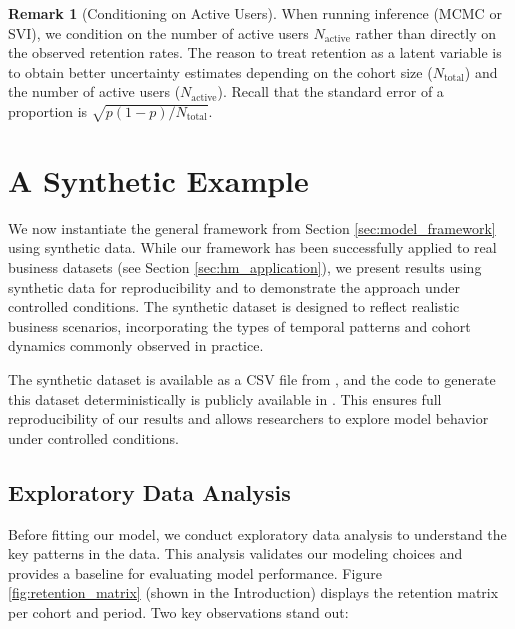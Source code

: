 \documentclass[11pt]{amsart}
\theoremstyle{definition}
\newtheorem{remark}{Remark}
\begin{document}
\begin{remark}[Conditioning on Active Users]
    When running inference (MCMC or SVI), we condition on the number of active users $N_{\text{active}}$ rather than
    directly on the observed retention rates. The reason to treat retention as a latent variable is to obtain better uncertainty
    estimates depending on the cohort size ($N_{\text{total}}$) and the number of active users ($N_{\text{active}}$). Recall
    that the standard error of a proportion is $\sqrt{p(1-p)/N_{\text{total}}}$.
\end{remark}


\section{A Synthetic Example}\label{sec:synthetic_example}

We now instantiate the general framework from Section \ref{sec:model_framework} using synthetic data. While our framework 
has been successfully applied to real business datasets (see Section \ref{sec:hm_application}), we present results using 
synthetic data for reproducibility and to demonstrate the approach under controlled conditions. The synthetic dataset is 
designed to reflect realistic business scenarios, incorporating the types of temporal patterns and cohort dynamics commonly 
observed in practice.

The synthetic dataset is available as a CSV file from \cite{orduz_revenue_retention}, and the code to generate this dataset
deterministically is publicly available in \cite{orduz_revenue_retention_data_code}. This ensures full reproducibility of
our results and allows researchers to explore model behavior under controlled conditions.

\subsection{Exploratory Data Analysis}

Before fitting our model, we conduct exploratory data analysis to understand the key patterns in the data. This analysis
validates our modeling choices and provides a baseline for evaluating model performance. Figure \ref{fig:retention_matrix}
(shown in the Introduction) displays the retention matrix per cohort and period. Two key observations stand out:
\end{document}
